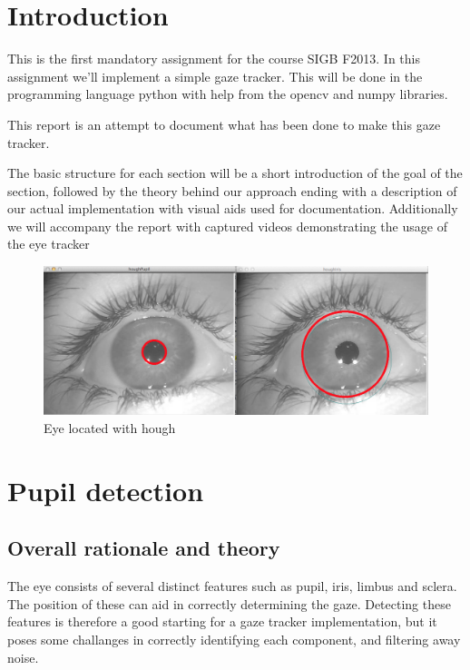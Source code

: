 \section{Introduction}

This is the first mandatory assignment for the course SIGB F2013. In
this assignment we'll implement a simple gaze tracker. This will be done
in the programming language python with help from the opencv and numpy
libraries.

This report is an attempt to document what has been done to make this
gaze tracker.

The basic structure for each section will be a short introduction of the
goal of the section, followed by the theory behind our approach ending
with a description of our actual implementation with visual aids used
for documentation. Additionally we will accompany the report with
captured videos demonstrating the usage of the eye tracker

\begin{figure}[htbp]
\centering
\includegraphics{pics/houghtransform.png}
\caption{Eye located with hough}
\end{figure}

\section{Pupil detection}

\subsection{Overall rationale and theory}

The eye consists of several distinct features such as pupil, iris,
limbus and sclera. The position of these can aid in correctly
determining the gaze. Detecting these features is therefore a good
starting for a gaze tracker implementation, but it poses some challanges
in correctly identifying each component, and filtering away noise.

